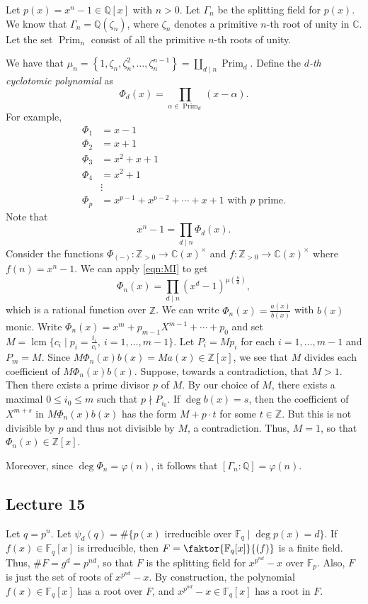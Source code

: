 \documentclass[10pt,letterpaper,cm]{nupset}
\theoremstyle{definition}
\theoremstyle{theorem}
\theoremstyle{remark}
\newcommand{\C}{\mathbb C}
\newcommand{\F}{\mathbb F}
\newcommand{\Q}{\mathbb Q}
\newcommand{\Z}{\mathbb Z}
\newcommand{\1}{\mathbf{1}}
\newcommand{\0}{\vec 0}
\DeclareMathOperator{\lcm}{lcm}
\DeclareMathOperator{\prim}{Prim}
\begin{document}
Let $p(x)= x^n -1 \in \Q[x]$ with $n>0$. Let $\Gamma_n$ be the splitting field for $p(x)$. We know that $\Gamma_n = \Q(\zeta_n)$, where $\zeta_n$ denotes a primitive $n$-th root of unity in $\C$. Let the set $\prim_n$ consist of all the primitive $n$-th roots of unity. 

We have that $\mu_n = \left\{1, \zeta_n, \zeta_n^2, \ldots, \zeta_n^{n-1}\right\} =\coprod_{d\mid n} \prim_d$. Define the \textit{$d$-th cyclotomic polynomial} as $$\Phi_d(x) = \prod_{\alpha \in \prim_d}(x-\alpha).$$ 
For example,
\begin{align*}
\Phi_1 & = x-1
\\ \Phi_2 & = x+1
\\ \Phi_3 & = x^2 + x+1
\\ \Phi_4 & =  x^2+1
\\ & \vdots
\\ \Phi_p & = x^{p-1}+x^{p-2}+\cdots + x + 1 \text{ with } p \text{ prime.}
\end{align*}
Note that $$ x^n-1 =\prod_{d\mid n}\Phi_d(x)   .$$ Consider the functions $\Phi_{(-)}:\Z_{>0} \to \C(x)^{\times}$ and $f: \Z_{>0} \to \C(x)^{\times}$ where $f(n) = x^n-1$. We can apply \eqref{eqn:MI} to get $$ \Phi_n(x) = \prod_{d\mid n}(x^d -1)^{\mu\left(\frac{n}{d}\right)} ,$$ which is a rational function over $\Z$. We can write $\Phi_n(x) = \frac{a(x)}{b(x)}$ with $b(x)$ monic. Write $\Phi_n(x) = x^m + p_{m-1}X^{m-1} + \cdots + p_0$ and set $M = \lcm\{c_i \mid p_i = \frac{t_i}{c_i}, \ i=1, \ldots, m-1\}$. Let $P_i = Mp_i$ for each $i=1, \ldots, m-1$ and $P_m = M$. Since $ M\Phi_n(x)b(x) =Ma(x)\in \Z[x]$,  we see that $M$ divides each coefficient of $M\Phi_n(x)b(x)$. Suppose, towards a contradiction, that $M >1$. Then there exists a prime divisor $p$ of $M$. By our choice of $M$, there exists a maximal $0\leq i_0 \leq m$ such that $p \nmid P_{i_0}$. If $\deg{b(x)} =s$, then the coefficient of $X^{m+s}$ in $M\Phi_n(x)b(x)$ has the form $M + p \cdot t$ for some $t\in \Z$. But this is not divisible by $p$ and thus not divisible by $M$, a contradiction.   Thus, $M =1$, so that $\Phi_n(x) \in \Z[x]$. 

Moreover, since $\deg{\Phi_n}= \varphi(n)$, it follows that $\left[\Gamma_n : \Q\right] = \varphi(n)$.


\subsection{Lecture 15}


Let $q= p^n$. Let $\psi_d(q) = \#\{p(x)$ irreducible over $\F_q \mid \deg{p(x)} =d \}$. If $f(x) \in \F_q[x]$ is irreducible, then $F = \faktor{\F_q[x]}{(f)}$ is a finite field. Thus, $\#F = g^d = p^{nd}$, so that $F$ is the splitting field for $x^{p^{nd}}-x$ over $\F_p$. Also, $F$ is just the set of roots of $x^{p^{nd}}-x$.  By construction, the polynomial $f(x) \in \F_q[x]$ has a root over $F$, and $x^{p^{nd}}-x \in \F_q[x]$ has a root in $F$. 
\end{document}
